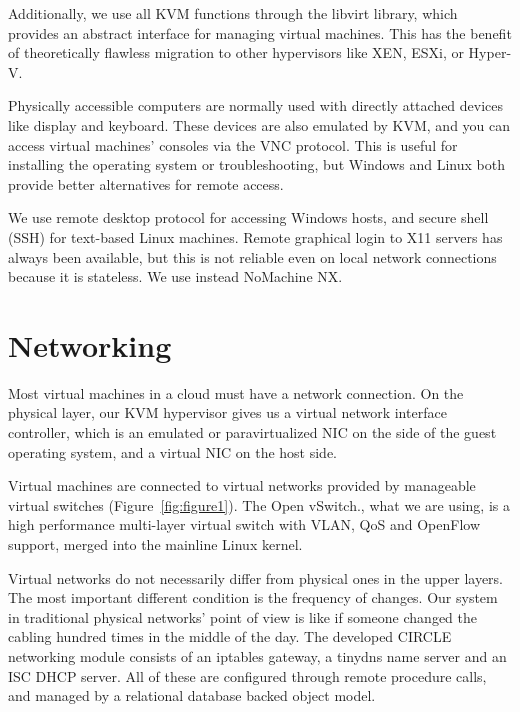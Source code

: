 \documentclass{llncs}
\begin{document}
Additionally, we use all KVM functions through the libvirt library, which provides an abstract interface for managing virtual machines.\cite{victoria2009creating} This has the benefit of theoretically flawless migration to other hypervisors like XEN, ESXi, or Hyper-V.\cite{bolte2010non}

Physically accessible computers are normally used with directly attached devices like display and keyboard. These devices are also emulated by KVM, and you can access virtual machines' consoles via the VNC protocol. This is useful for installing the operating system or troubleshooting, but Windows and Linux both provide better alternatives for remote access.

We use remote desktop protocol for accessing Windows hosts, and secure shell (SSH) for text-based Linux machines. Remote graphical login to X11 servers has always been available, but this is not reliable even on local network connections because it is stateless. We use instead NoMachine NX\cite{pinzari2003introduction}.
   
\section{Networking}
Most virtual machines in a cloud must have a network connection.  On the physical layer, our KVM hypervisor gives us a virtual network interface controller, which is an emulated or paravirtualized NIC on the side of the guest operating system, and a virtual NIC on the host side.

Virtual machines are connected to virtual networks provided by manageable virtual switches (Figure~\ref{fig:figure1}). The Open vSwitch.\cite{pfaff2009extending}, what we are using, is a high performance multi-layer virtual switch with VLAN, QoS and OpenFlow support, merged into the mainline Linux kernel.

Virtual networks do not necessarily differ from physical ones in the upper layers. The most important different condition is the frequency of changes. Our system in traditional physical networks' point of view is like if someone changed the cabling hundred times in the middle of the day. The developed CIRCLE networking module consists of an iptables gateway, a tinydns name server and an ISC DHCP server. All of these are configured through remote procedure calls, and managed by a relational database backed object model. 
\end{document}
